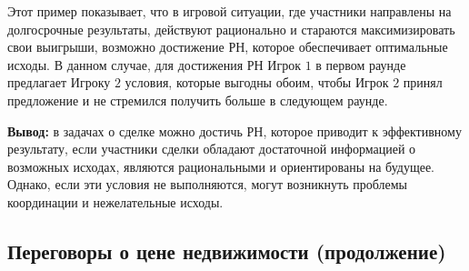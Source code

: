 Этот пример показывает, что в игровой ситуации, где участники направлены на долгосрочные результаты, действуют рационально и стараются максимизировать свои выигрыши, возможно достижение РН, которое обеспечивает оптимальные исходы. В данном случае, для достижения РН Игрок $1$ в первом раунде предлагает Игроку $2$ условия, которые выгодны обоим, чтобы Игрок $2$ принял предложение и не стремился получить больше в следующем раунде.

\textbf{Вывод:} в задачах о сделке можно достичь РН, которое приводит к эффективному результату, если участники сделки обладают достаточной информацией о возможных исходах, являются рациональными и ориентированы на будущее. Однако, если эти условия не выполняются, могут возникнуть проблемы координации и нежелательные исходы.


\subsection{Переговоры о цене недвижимости (продолжение)}

